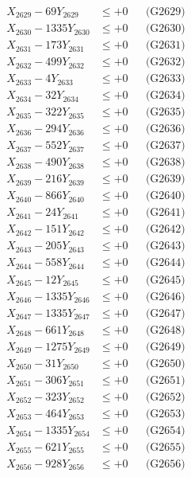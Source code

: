 \documentclass[a4paper,10pt]{article}
\begin{document}
{\begin{align}
X_{2629} - 69Y_{2629} &\leq +0 && \text{(G2629)} \\
X_{2630} - 1335Y_{2630} &\leq +0 && \text{(G2630)} \\
\allowbreak
X_{2631} - 173Y_{2631} &\leq +0 && \text{(G2631)} \\
X_{2632} - 499Y_{2632} &\leq +0 && \text{(G2632)} \\
X_{2633} - 4Y_{2633} &\leq +0 && \text{(G2633)} \\
X_{2634} - 32Y_{2634} &\leq +0 && \text{(G2634)} \\
X_{2635} - 322Y_{2635} &\leq +0 && \text{(G2635)} \\
X_{2636} - 294Y_{2636} &\leq +0 && \text{(G2636)} \\
X_{2637} - 552Y_{2637} &\leq +0 && \text{(G2637)} \\
X_{2638} - 490Y_{2638} &\leq +0 && \text{(G2638)} \\
X_{2639} - 216Y_{2639} &\leq +0 && \text{(G2639)} \\
X_{2640} - 866Y_{2640} &\leq +0 && \text{(G2640)} \\
\allowbreak
X_{2641} - 24Y_{2641} &\leq +0 && \text{(G2641)} \\
X_{2642} - 151Y_{2642} &\leq +0 && \text{(G2642)} \\
X_{2643} - 205Y_{2643} &\leq +0 && \text{(G2643)} \\
X_{2644} - 558Y_{2644} &\leq +0 && \text{(G2644)} \\
X_{2645} - 12Y_{2645} &\leq +0 && \text{(G2645)} \\
X_{2646} - 1335Y_{2646} &\leq +0 && \text{(G2646)} \\
X_{2647} - 1335Y_{2647} &\leq +0 && \text{(G2647)} \\
X_{2648} - 661Y_{2648} &\leq +0 && \text{(G2648)} \\
X_{2649} - 1275Y_{2649} &\leq +0 && \text{(G2649)} \\
X_{2650} - 31Y_{2650} &\leq +0 && \text{(G2650)} \\
\allowbreak
X_{2651} - 306Y_{2651} &\leq +0 && \text{(G2651)} \\
X_{2652} - 323Y_{2652} &\leq +0 && \text{(G2652)} \\
X_{2653} - 464Y_{2653} &\leq +0 && \text{(G2653)} \\
X_{2654} - 1335Y_{2654} &\leq +0 && \text{(G2654)} \\
X_{2655} - 621Y_{2655} &\leq +0 && \text{(G2655)} \\
X_{2656} - 928Y_{2656} &\leq +0 && \text{(G2656)} \\

\end{align}}
\end{document}
